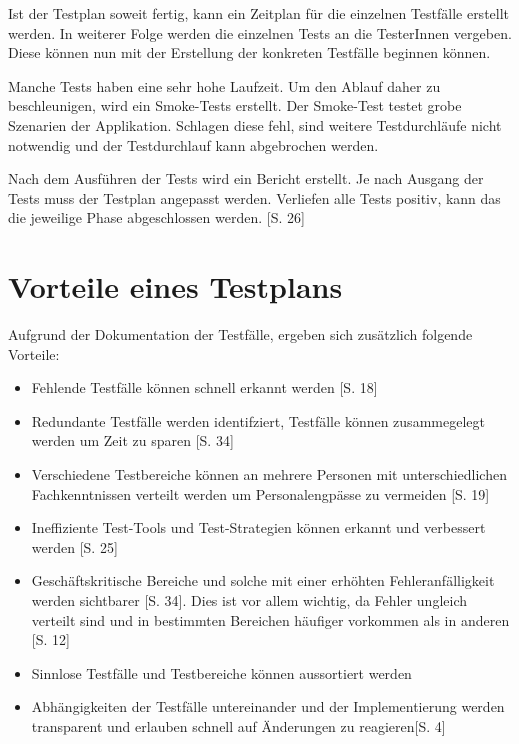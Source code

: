 \documentclass[a4paper,bibtotoc,oneside]{scrbook}
\begin{document}
Ist der Testplan soweit fertig, kann ein Zeitplan für die einzelnen Testfälle erstellt werden. In weiterer Folge werden die einzelnen Tests an die TesterInnen vergeben. Diese können nun mit der Erstellung der konkreten Testfälle beginnen können.

Manche Tests haben eine sehr hohe Laufzeit. Um den Ablauf daher zu beschleunigen, wird ein Smoke-Tests erstellt. Der Smoke-Test testet grobe Szenarien der Applikation. Schlagen diese fehl, sind weitere Testdurchläufe nicht notwendig und der Testdurchlauf kann abgebrochen werden. 

Nach dem Ausführen der Tests wird ein Bericht erstellt. Je nach Ausgang der Tests muss der Testplan angepasst werden. Verliefen alle Tests positiv, kann das die jeweilige Phase abgeschlossen werden. \cite{eval_regression}[S. 26]


\section{Vorteile eines Testplans}

Aufgrund der Dokumentation der Testfälle, ergeben sich zusätzlich folgende Vorteile:

\begin{itemize}
	\item Fehlende Testfälle können schnell erkannt werden \cite{test_large_systems}[S. 18]
	\item Redundante Testfälle werden identifziert, Testfälle können zusammegelegt werden um Zeit zu sparen \cite{testing_apps_on_web}[S. 34]
	\item Verschiedene Testbereiche können an mehrere Personen mit unterschiedlichen Fachkenntnissen verteilt werden um Personalengpässe zu vermeiden \cite{test_large_systems}[S. 19]
	\item Ineffiziente Test-Tools und Test-Strategien können erkannt und verbessert werden \cite{eval_regression}[S. 25]
	\item Geschäftskritische Bereiche und solche mit einer erhöhten  Fehleranfälligkeit werden sichtbarer \cite{testing_apps_on_web}[S. 34]. Dies ist vor allem wichtig, da Fehler ungleich verteilt sind und in bestimmten Bereichen häufiger vorkommen als in anderen \cite{eval_regression}[S. 12]
	\item Sinnlose Testfälle und Testbereiche können aussortiert werden 
	\item Abhängigkeiten der Testfälle untereinander und der Implementierung werden transparent und erlauben schnell auf Änderungen zu reagieren\cite{test_auto}[S. 4]
\end{itemize}
\end{document}
